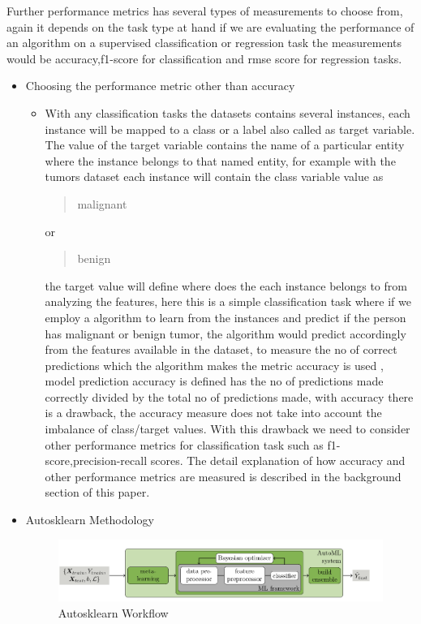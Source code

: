 Further performance metrics has several types of measurements to choose from, again it depends on the task type at hand if we are evaluating the performance of an algorithm on a supervised classification or regression task the measurements would be accuracy,f1-score for classification and rmse score for regression tasks.
\begin{itemize}
    \item Choosing the performance metric other than accuracy
    \begin{itemize}
        
        \item With any classification tasks the datasets contains several instances, each instance will be mapped to a class or a label also called as target variable. The value of the target variable contains the name of a particular entity where the instance belongs to that named entity, for example with the tumors dataset each instance will contain the class variable value as \blockquote{malignant} or \blockquote{benign} the target value will define where does the each instance belongs to from analyzing the features, here this is a simple classification task where if we employ a algorithm to learn from the instances and predict if the person has malignant or benign tumor, the algorithm would predict accordingly from the features available in the dataset, to measure the no of correct predictions which the algorithm makes the metric accuracy is used , model prediction accuracy is defined has the no of predictions made correctly divided by the total no of predictions made, with accuracy there is a drawback, the accuracy measure does not take into account the imbalance of class/target values. With this drawback we need to consider other performance metrics for classification task such as f1-score,precision-recall scores. The detail explanation of how accuracy and other performance metrics are measured is described in the background section of this paper.

    \end{itemize}
    
    
    
    \item Autosklearn Methodology
    
    \begin{figure}[!h]
    	\centering
    	\includegraphics[width=1.1\linewidth]{thesis_template/images/autosklearn.png}
    	\caption{Autosklearn Workflow}
    	\label{fig:autosklearn_workflow}
    \end{figure}
    

\end{itemize}
